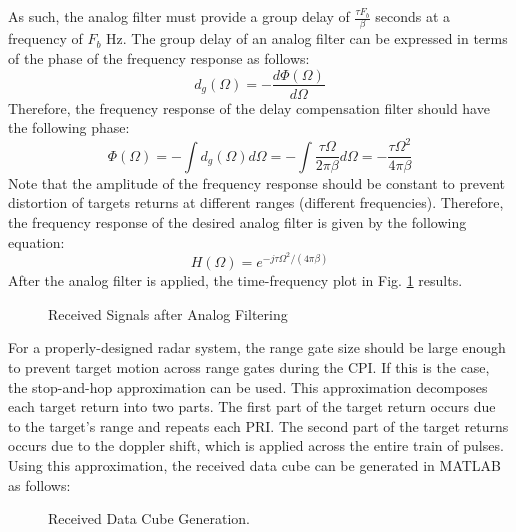 \documentclass[conference]{IEEEtran}
\begin{document}
As such, the analog filter must provide a group delay of $\frac{\tau F_b}{\beta}$ seconds at a frequency of $F_b$ Hz. The group delay of an analog filter can be expressed in terms of the phase of the frequency response as follows:
\begin{equation}
d_g(\Omega) = -\frac{d\Phi(\Omega)}{d\Omega}
\end{equation}
Therefore, the frequency response of the delay compensation filter should have the following phase:
\begin{equation}
\Phi(\Omega) = -\int d_g(\Omega)d\Omega = -\int\frac{\tau\Omega}{2\pi\beta}d\Omega = -\frac{\tau\Omega^2}{4\pi\beta}
\end{equation}
Note that the amplitude of the frequency response should be constant to prevent distortion of targets returns at different ranges (different frequencies). Therefore, the frequency response of the desired analog filter is given by the following equation:
\begin{equation}
H(\Omega) = e^{-j\tau\Omega^2/(4\pi\beta)}
\end{equation} 
After the analog filter is applied, the time-frequency plot in Fig. \ref{beat_freq_analog_filt} results.
\begin{figure}[H]
\centerline{}
\caption{Received Signals after Analog Filtering}
\label{beat_freq_analog_filt}
\end{figure}
For a properly-designed radar system, the range gate size should be large enough to prevent target motion across range gates during the CPI. If this is the case, the stop-and-hop approximation can be used. This approximation decomposes each target return into two parts. The first part of the target return occurs due to the target's range and repeats each PRI. The second part of the target returns occurs due to the doppler shift, which is applied across the entire train of pulses. Using this approximation, the received data cube can be generated in MATLAB as follows:
\begin{figure}[H]
\centerline{}
\caption{Received Data Cube Generation.}
\label{adc_sig_gen}
\end{figure}
\end{document}
